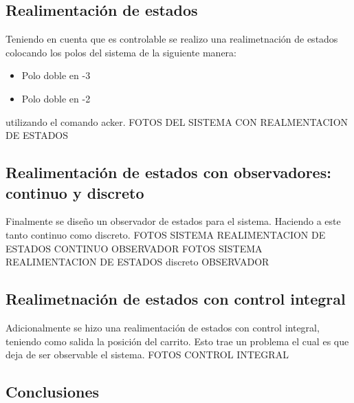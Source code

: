  \subsection{Realimentaci\'on de estados}
 Teniendo en cuenta que es controlable se realizo una realimetnaci\'on de estados colocando los polos del sistema de la siguiente manera:
 \begin{itemize}
 \item Polo doble en -3
  \item Polo doble en -2
\end{itemize}
utilizando el comando acker.
FOTOS DEL SISTEMA CON REALMENTACION DE ESTADOS
 \subsection{Realimentaci\'on de estados con observadores: continuo y discreto}
Finalmente se diseño un observador de estados  para el sistema. Haciendo a este tanto continuo como discreto.
FOTOS SISTEMA REALIMENTACION DE ESTADOS CONTINUO OBSERVADOR
FOTOS SISTEMA REALIMENTACION DE ESTADOS discreto OBSERVADOR
\subsection{Realimetnaci\'on de estados con control integral}
Adicionalmente se hizo una realimentaci\'on de estados con control integral, teniendo como salida la posici\'on del carrito. Esto trae un problema el cual es que deja de ser observable el sistema.
FOTOS CONTROL INTEGRAL
\subsection{Conclusiones}

